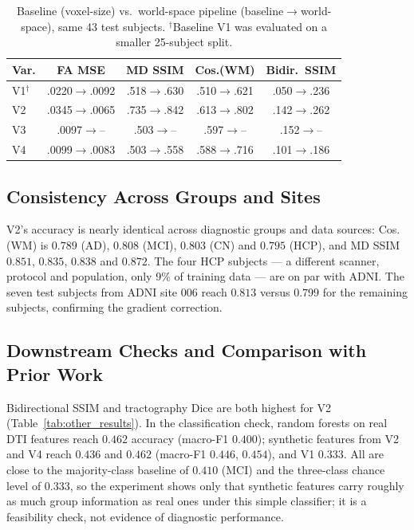 \documentclass[conference,compsoc]{IEEEtran}
\begin{document}
\begin{table}[t]
\centering
\footnotesize
\setlength{\tabcolsep}{2.4pt}
\caption{Baseline (voxel-size) vs.\ world-space pipeline (baseline$\to$world-space), same 43 test subjects. $^\dagger$Baseline V1 was evaluated on a smaller 25-subject split.}
\label{tab:correction}
\begin{tabular}{lcccc}
\toprule
\textbf{Var.} & \textbf{FA MSE} & \textbf{MD SSIM} & \textbf{Cos.(WM)} & \textbf{Bidir.\ SSIM} \\
\midrule
V1$^\dagger$ & .0220$\to$.0092 & .518$\to$.630 & .510$\to$.621 & .050$\to$.236 \\
V2 & .0345$\to$.0065 & .735$\to$.842 & .613$\to$.802 & .142$\to$.262 \\
V3 & .0097$\to$\;--\; & .503$\to$\;--\; & .597$\to$\;--\; & .152$\to$\;--\; \\
V4 & .0099$\to$.0083 & .503$\to$.558 & .588$\to$.716 & .101$\to$.186 \\
\bottomrule
\end{tabular}
\end{table}

\subsection{Consistency Across Groups and Sites}
V2's accuracy is nearly identical across diagnostic groups and data sources: Cos.(WM) is $0.789$ (AD), $0.808$ (MCI), $0.803$ (CN) and $0.795$ (HCP), and MD SSIM $0.851$, $0.835$, $0.838$ and $0.872$. The four HCP subjects --- a different scanner, protocol and population, only 9\% of training data --- are on par with ADNI. The seven test subjects from ADNI site 006 reach $0.813$ versus $0.799$ for the remaining subjects, confirming the gradient correction.

\subsection{Downstream Checks and Comparison with Prior Work}
Bidirectional SSIM and tractography Dice are both highest for V2 (Table~\ref{tab:other_results}). In the classification check, random forests on real DTI features reach $0.462$ accuracy (macro-F1 $0.400$); synthetic features from V2 and V4 reach $0.436$ and $0.462$ (macro-F1 $0.446$, $0.454$), and V1 $0.333$. All are close to the majority-class baseline of $0.410$ (MCI) and the three-class chance level of $0.333$, so the experiment shows only that synthetic features carry roughly as much group information as real ones under this simple classifier; it is a feasibility check, not evidence of diagnostic performance.
\end{document}
